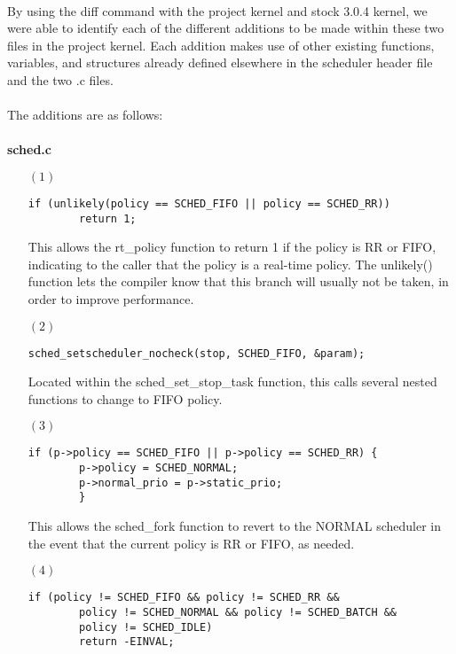 \documentclass[letterpaper,10pt]{article}
\begin{document}
\paragraph{} 
By using the diff command with the project kernel and stock 3.0.4 kernel, we were able to identify each of the different additions to be made within these two files in the project kernel. Each addition makes use of other existing functions, variables, and structures already defined elsewhere in the scheduler header file and the two .c files.
\\\\The additions are as follows:
\\\\
\textbf{sched.c}
\begin{enumerate}
\item[$(1)$]
\begin{verbatim} 
if (unlikely(policy == SCHED_FIFO || policy == SCHED_RR))
        return 1;

\end{verbatim}

This allows the rt\_policy function to return 1 if the policy is RR or FIFO, indicating to the caller that the policy is a real-time policy. The unlikely() function lets the compiler know that this branch will usually not be taken, in order to improve performance.

\item[$(2)$]
\begin{verbatim} 
sched_setscheduler_nocheck(stop, SCHED_FIFO, &param);

\end{verbatim}

Located within the sched\_set\_stop\_task function, this calls several nested functions to change to FIFO policy.

\item[$(3)$]
\begin{verbatim} 
if (p->policy == SCHED_FIFO || p->policy == SCHED_RR) {
        p->policy = SCHED_NORMAL;
        p->normal_prio = p->static_prio;
        }

\end{verbatim}
This allows the sched\_fork function to revert to the NORMAL scheduler in the event that the current policy is RR or FIFO, as needed.

\item[$(4)$]
\begin{verbatim} 
if (policy != SCHED_FIFO && policy != SCHED_RR &&
        policy != SCHED_NORMAL && policy != SCHED_BATCH &&
        policy != SCHED_IDLE)
        return -EINVAL;


\end{verbatim}
\end{enumerate}
\end{document}

